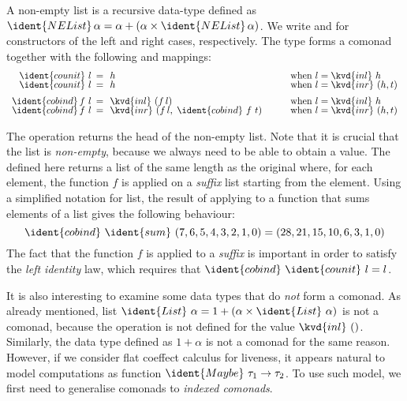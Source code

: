 \begin{example}
A non-empty list is a recursive data-type defined as $\ident{NEList}\,\alpha = \alpha + (\alpha \times \ident{NEList}\,\alpha)$.
We write  and  for constructors of the left and right cases, respectively. The 
type  forms a comonad together with the following  and  mappings:
%
\begin{equation*}
\begin{array}{rclll}
\ident{counit}~l &\narrow{=}& h &\quad&\textnormal{when}~l=\kvd{inl}~h\\[-0.25em]
\ident{counit}~l &\narrow{=}& h &&\textnormal{when}~l=\kvd{inr}~(h, t)\\[0.5em]
\ident{cobind}\,f~l &\narrow{=}& \kvd{inl}~(f\,l) &&\textnormal{when}~l=\kvd{inl}~h\\[-0.25em]
\ident{cobind}\,f~l &\narrow{=}& \kvd{inr}~(f\,l,\;\ident{cobind}~f~t) &&\textnormal{when}~l=\kvd{inr}~(h, t)
\end{array}
\end{equation*}
\end{example}

\noindent
The  operation returns the head of the non-empty list. Note that it is crucial that
the list is \emph{non-empty}, because we always need to be able to obtain a value. The 
defined here returns a list of the same length as the original where, for each element, the 
function $f$ is applied on a \emph{suffix} list starting from the element. Using a simplified
notation for list, the result of applying  to a function that sums elements of a
list gives the following behaviour:
%
\begin{equation*}
\ident{cobind}~\ident{sum}~(7,6,5,4,3,2,1,0) = (28,21,15,10,6,3,1,0)
\end{equation*}
%
The fact that the function $f$ is applied to a \emph{suffix} is important in order to satisfy the
\emph{left identity} law, which requires that $\ident{cobind}~\ident{counit}~l = l$.

It is also interesting to examine some data types that do \emph{not} form a comonad. As already
mentioned, list $\ident{List}~\alpha = 1 + (\alpha \times \ident{List}~\alpha)$ is not a comonad,
because the  operation is not defined for the value $\kvd{inl}~()$. Similarly,
the  data type defined as $1 + \alpha$ is not a comonad for the same reason.
However, if we consider flat coeffect calculus for liveness, it appears natural to model computations
as function $\ident{Maybe}~\tau_1 \rightarrow \tau_2$. To use such model, we first need to 
generalise comonads to \emph{indexed comonads}.

